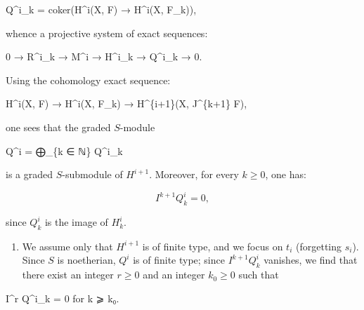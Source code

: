 \documentclass[
  11pt,
  a4paper,
]{book}
\newenvironment{Shaded}{}{}
\newcommand{\NormalTok}[1]{#1}
\providecommand{\tightlist}{%
  \setlength{\itemsep}{0pt}\setlength{\parskip}{0pt}}
\begin{document}
\begin{Shaded}
\begin{Highlighting}[]
\NormalTok{Q\^{}i\_k = coker(H\^{}i(X, F) → H\^{}i(X, F\_k)),}
\end{Highlighting}
\end{Shaded}

whence a projective system of exact sequences:

\begin{Shaded}
\begin{Highlighting}[]
\NormalTok{0 → R\^{}i\_k → M\^{}i → H\^{}i\_k → Q\^{}i\_k → 0.}
\end{Highlighting}
\end{Shaded}

Using the cohomology exact sequence:

\begin{Shaded}
\begin{Highlighting}[]
\NormalTok{H\^{}i(X, F) → H\^{}i(X, F\_k) → H\^{}\{i+1\}(X, J\^{}\{k+1\} F),}
\end{Highlighting}
\end{Shaded}

one sees that the graded \(S\)-module

\begin{Shaded}
\begin{Highlighting}[]
\NormalTok{Q\^{}i = ⨁\_\{k ∈ ℕ\} Q\^{}i\_k}
\end{Highlighting}
\end{Shaded}

is a graded \(S\)-submodule of \(H^{i+1}\). Moreover, for every
\(k \geqslant 0\), one has:

\[ I^{k+1} Q^{i}_{k} = 0, \]

since \(Q^{i}_{k}\) is the image of \(H^{i}_{k}\).

\begin{enumerate}
\def\labelenumi{(\alph{enumi})}
\setcounter{enumi}{1}
\tightlist
\item
  We assume only that \(H^{i+1}\) is of finite type, and we focus on
  \(t_{i}\) (forgetting \(s_{i}\)). Since \(S\) is noetherian, \(Q^{i}\)
  is of finite type; since \(I^{k+1} Q^{i}_{k}\) vanishes, we find that
  there exist an integer \(r
  \geqslant 0\) and an integer \(k_{0} \geqslant 0\) such that
\end{enumerate}

\begin{Shaded}
\begin{Highlighting}[]
\NormalTok{I\^{}r Q\^{}i\_k = 0    for k ⩾ k₀.}
\end{Highlighting}
\end{Shaded}
\end{document}
